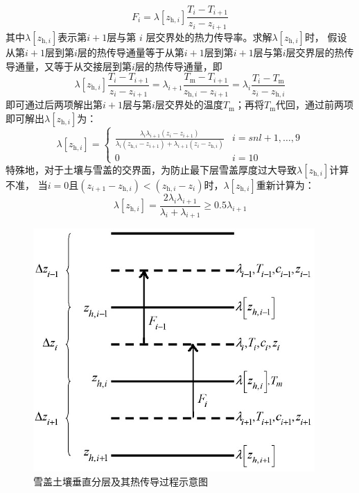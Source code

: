 \begin{equation}
  F_{i}=\lambda\left[z_{\mathrm{h},i}\right] \frac{T_{i}-T_{i+1}}{z_{i}-z_{i+1}}
\end{equation}
其中$\lambda\left[z_{\mathrm{h},i}\right]$表示第$i+1$层与第 $i$ 层交界处的热力传导率。求解$\lambda\left[z_{\mathrm{h},i}\right]$时，
假设从第$i+1$层到第$i$层的热传导通量等于从第$i+1$层到第$i+1$层与第$i$层交界层的热传导通量，又等于从交接层到第$i$层的热传导通量，即
\begin{equation}
  \lambda\left[z_{\mathrm{h},i}\right] \frac{T_{i}-T_{i+1}}{z_{i}-z_{i+1}}=\lambda_{i+1} \frac{T_{\mathrm{m}}-T_{i+1}}{z_{\mathrm{h},i}-z_{i+1}}=\lambda_{i} \frac{T_{i}-T_{\mathrm{m}}}{z_{i}-z_{\mathrm{h},i}}
\end{equation}
即可通过后两项解出第$i+1$层与第$i$层交界处的温度$T_{\mathrm {m}} $；再将$T_{\mathrm {m}} $代回，通过前两项即可解出$\lambda\left[z_{\mathrm{h},i}\right]$为：
\begin{equation}
  \lambda\left[z_{\mathrm{h},i}\right]=\begin{cases}
    \frac{\lambda_{i} \lambda_{i+1}\left(z_{i}-z_{i+1}\right)}{\lambda_{i}\left(z_{\mathrm{h},i}-z_{i+1}\right)+\lambda_{i+1}\left(z_{i}-z_{\mathrm{h},i}\right)} & i=snl+1, \ldots, 9 \\
    0 & i=10
  \end{cases}
\end{equation}
特殊地，对于土壤与雪盖的交界面，为防止最下层雪盖厚度过大导致$\lambda\left[z_{\mathrm{h},i}\right]$计算不准，
当$i=0$且$\left(z_{i+1}-z_{\mathrm{h},i}\right)<\left(z_{\mathrm{h},i}-z_i\right)$时，$\lambda\left[z_{\mathrm{h},i}\right]$重新计算为：
\begin{equation}
  \lambda\left[z_{\mathrm{h},i}\right]=\frac{2 \lambda_{i} \lambda_{i+1}}{\lambda_{i}+\lambda_{i+1}} \geqslant 0.5 \lambda_{i+1}
\end{equation}
{
  \begin{figure}[htbp]
    \centering
    \includegraphics{Figures/雪盖土壤热力过程/雪盖土壤垂直分层及其热传导过程示意图.png}
    \caption{雪盖土壤垂直分层及其热传导过程示意图}
    \label{fig:雪盖土壤垂直分层及其热传导过程示意图}
  \end{figure}
}



